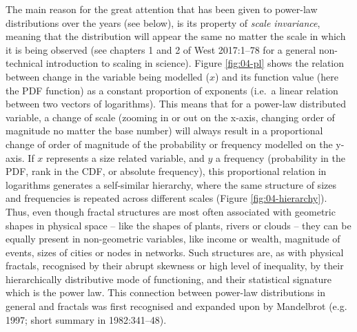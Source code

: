 \documentclass[
  12pt,
]{book}
\begin{document}
The main reason for the great attention that has been given to power-law distributions over the years (see below), is its property of \emph{scale invariance}, meaning that the distribution will appear the same no matter the scale in which it is being observed (see chapters 1 and 2 of West 2017:1--78 for a general non-technical introduction to scaling in science). Figure \ref{fig:04-pl} shows the relation between change in the variable being modelled (\(x\)) and its function value (here the PDF function) as a constant proportion of exponents (i.e.~a linear relation between two vectors of logarithms). This means that for a power-law distributed variable, a change of scale (zooming in or out on the x-axis, changing order of magnitude no matter the base number) will always result in a proportional change of order of magnitude of the probability or frequency modelled on the y-axis. If \(x\) represents a size related variable, and \(y\) a frequency (probability in the PDF, rank in the CDF, or absolute frequency), this proportional relation in logarithms generates a self-similar hierarchy, where the same structure of sizes and frequencies is repeated across different scales (Figure \ref{fig:04-hierarchy}). Thus, even though fractal structures are most often associated with geometric shapes in physical space -- like the shapes of plants, rivers or clouds -- they can be equally present in non-geometric variables, like income or wealth, magnitude of events, sizes of cities or nodes in networks. Such structures are, as with physical fractals, recognised by their abrupt skewness or high level of inequality, by their hierarchically distributive mode of functioning, and their statistical signature which is the power law. This connection between power-law distributions in general and fractals was first recognised and expanded upon by Mandelbrot (e.g. 1997; short summary in 1982:341--48).
\end{document}

